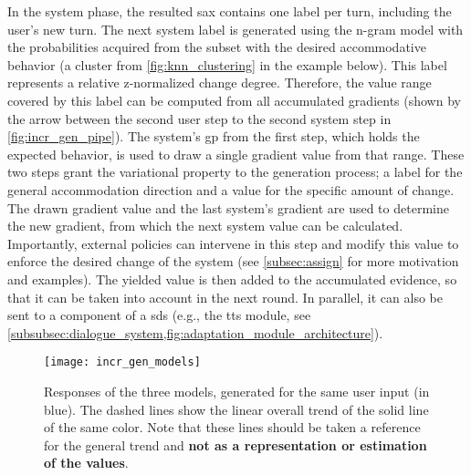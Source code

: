 In the system phase, the resulted \ac{sax} contains one label per turn, including the user's new turn.
The next system label is generated using the n-gram model with the probabilities acquired from the subset with the desired accommodative behavior (a cluster from \cref{fig:knn_clustering} in the example below).
This label represents a relative z-normalized change degree.
Therefore, the value range covered by this label can be computed from all accumulated gradients (shown by the arrow between the second user step to the second system step in \cref{fig:incr_gen_pipe}).
The system's \ac{gp} from the first step, which holds the expected behavior, is used to draw a single gradient value from that range.
These two steps grant the variational property to the generation process; a label for the general accommodation direction and a value for the specific amount of change.
The drawn gradient value and the last system's gradient are used to determine the new gradient, from which the next system value can be calculated.
Importantly, external policies can intervene in this step and modify this value to enforce the desired change of the system (see \cref{subsec:assign} for more motivation and examples).
The yielded value is then added to the accumulated evidence, so that it can be taken into account in the next round.
In parallel, it can also be sent to a component of a \ac{sds} (e.g., the \ac{tts} module, see \cref{subsubsec:dialogue_system,fig:adaptation_module_architecture}).

\begin{figure}[t]
	\centering
	\texttt{[image: incr\_gen\_models]}
	\caption[]
		{Responses of the three models, generated for the same user input (in blue).
	 	 The dashed lines show the linear overall trend of the solid line of the same color.
	 	 Note that these lines should be taken a reference for the general trend and \textbf{not as a representation or estimation of the values}.}
	\label{fig:incr_gen_models}
\end{figure}

